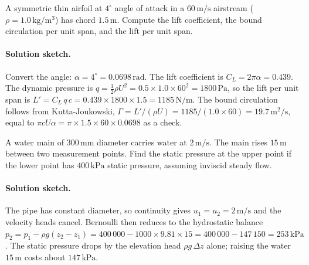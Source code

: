 \begin{exercise}
A symmetric thin airfoil at $4^{\circ}$ angle of attack in a
$60\,\si{\meter\per\second}$ airstream ($\rho =
1.0\,\si{\kilogram\per\meter\cubed}$) has chord $1.5\,\si{\meter}$.
Compute the lift coefficient, the bound circulation per unit span,
and the lift per unit span.

\paragraph{Solution sketch.} Convert the angle: $\alpha = 4^\circ =
0.0698\,\text{rad}$. The lift coefficient is $C_L = 2\pi\alpha =
0.439$. The dynamic pressure is $q = \tfrac12\rho U^2 = 0.5\times 1.0
\times 60^2 = 1800\,\text{Pa}$, so the lift per unit span is $L' =
C_L\,q\,c = 0.439\times 1800\times 1.5 = 1185\,\si{\newton\per
\meter}$. The bound circulation follows from Kutta-Joukowski, $\Gamma
= L'/(\rho U) = 1185/(1.0\times 60) = 19.7\,\si{\meter\squared\per
\second}$, equal to $\pi c U\alpha = \pi\times 1.5\times 60\times
0.0698$ as a check.
\end{exercise}

\begin{exercise}
A water main of $300\,\si{\milli\meter}$ diameter carries water at
$2\,\si{\meter\per\second}$. The main rises $15\,\si{\meter}$
between two measurement points. Find the static pressure at the
upper point if the lower point has $400\,\text{kPa}$ static
pressure, assuming inviscid steady flow.

\paragraph{Solution sketch.} The pipe has constant diameter, so
continuity gives $u_1 = u_2 = 2\,\si{\meter\per\second}$ and the
velocity heads cancel. Bernoulli then reduces to the hydrostatic
balance $p_2 = p_1 - \rho g(z_2 - z_1) = 400\,000 - 1000\times 9.81
\times 15 = 400\,000 - 147\,150 = 253\,\text{kPa}$. The static
pressure drops by the elevation head $\rho g\,\Delta z$ alone; raising
the water $15\,\si{\meter}$ costs about $147\,\text{kPa}$.
\end{exercise}

